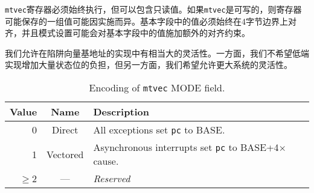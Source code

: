 \iffalse
The {\tt mtvec} register must always be implemented, but can contain
a read-only value.  If {\tt mtvec} is writable, the set of values
the register may hold can vary by implementation.  The value in the BASE field
must always be aligned on a 4-byte boundary, and the MODE setting may impose
additional alignment constraints on the value in the BASE field.
\fi

{\tt mtvec}寄存器必须始终执行，但可以包含只读值。如果{\tt mtvec}是可写的，则寄存器可能保存的一组值可能因实施而异。基本字段中的值必须始终在4字节边界上对齐，并且模式设置可能会对基本字段中的值施加额外的对齐约束。

\iffalse
\begin{commentary}
We allow for considerable flexibility in implementation of the trap
vector base address.  On the one hand, we do not wish to burden low-end
implementations with a large number of state bits, but on the other
hand, we wish to allow flexibility for larger systems.
\end{commentary}
\fi

\begin{commentary}
我们允许在陷阱向量基地址的实现中有相当大的灵活性。一方面，我们不希望低端实现增加大量状态位的负担，但另一方面，我们希望允许更大系统的灵活性。
\end{commentary}

\begin{table*}[h!]
\begin{center}
\begin{tabular}{|r|c|l|}
\hline
Value & Name & Description \\
\hline
0      & Direct   & All exceptions set {\tt pc} to BASE. \\
1      & Vectored & Asynchronous interrupts set {\tt pc} to BASE+4$\times$cause. \\
$\ge$2 & --- & {\em Reserved} \\
\hline
\end{tabular}
\end{center}
\caption{Encoding of {\tt mtvec} MODE field.}
\label{mtvec-mode}
\end{table*}

\iffalse
The encoding of the MODE field is shown in Table~\ref{mtvec-mode}.  When
MODE=Direct, all traps into machine mode cause the {\tt pc} to be set to the
address in the BASE field.  When MODE=Vectored, all synchronous exceptions
into machine mode cause the {\tt pc} to be set to the address in the BASE
field, whereas interrupts cause the {\tt pc} to be set to the address in
the BASE field plus four times the interrupt cause number.  For example,
a machine-mode timer interrupt (see Table~\ref{mcauses} on page~\pageref{mcauses}) causes the {\tt pc}
to be set to BASE+{\tt 0x1c}.
\fi

